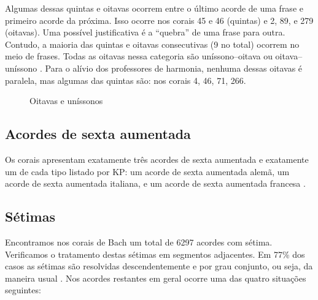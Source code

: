 Algumas dessas quintas e oitavas ocorrem entre o último acorde de uma
frase e primeiro acorde da próxima. Isso ocorre nos corais 45 e 46
(quintas) e 2, 89, e 279 (oitavas).  Uma possível
justificativa é a ``quebra'' de uma frase para outra. Contudo, a
maioria das quintas e oitavas consecutivas (9 no total) ocorrem no
meio de frases. Todas as oitavas nessa categoria são uníssono--oitava
ou oitava--uníssono . Para o alívio dos professores de
harmonia, nenhuma dessas oitavas é paralela, mas algumas das quintas
são: nos corais 4, 46, 71, 266.

\begin{figure}
  \centering
  \qquad
  \qquad
  \caption{Oitavas e uníssonos}
  \label{fig:oitavas-e-unissonos}
\end{figure}

\subsection{Acordes de sexta aumentada}
\label{sec:acordes-de-sexta}

Os corais apresentam exatamente três acordes de sexta aumentada e
exatamente um de cada tipo listado por KP: um acorde de sexta
aumentada alemã, um acorde de sexta aumentada italiana, e um acorde de
sexta aumentada francesa .

\subsection{Sétimas}
\label{sec:setimas}

Encontramos nos corais de Bach um total de 6297 acordes com sétima.
Verificamos o tratamento destas sétimas em segmentos adjacentes. Em
77\% dos casos as sétimas são resolvidas descendentemente e por grau
conjunto, ou seja, da maneira usual \cite[p. 207]{kostka.ea00:tonal}.
Nos acordes restantes em geral ocorre uma das quatro situações
seguintes:


